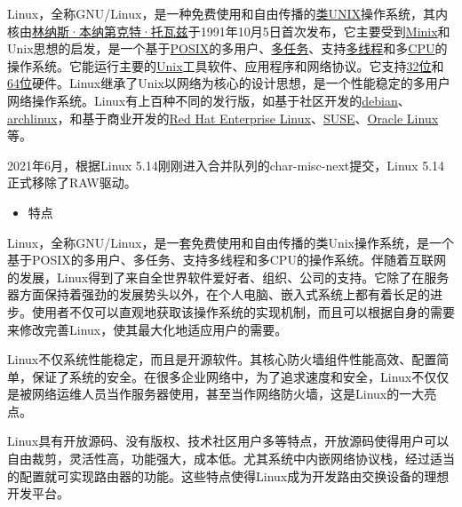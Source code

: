 \documentclass[
]{article}
\begin{document}
Linux，全称GNU/Linux，是一种免费使用和自由传播的\href{https://baike.baidu.com/item/类UNIX/9032872}{类UNIX}操作系统，其内核由\href{https://baike.baidu.com/item/林纳斯·本纳第克特·托瓦兹/1034429}{林纳斯·本纳第克特·托瓦兹}于1991年10月5日首次发布，它主要受到\href{https://baike.baidu.com/item/Minix/7106045}{Minix}和Unix思想的启发，是一个基于\href{https://baike.baidu.com/item/POSIX}{POSIX}的多用户、\href{https://baike.baidu.com/item/多任务/1011764}{多任务}、支持\href{https://baike.baidu.com/item/多线程/1190404}{多线程}和多\href{https://baike.baidu.com/item/CPU}{CPU}的操作系统。它能运行主要的\href{https://baike.baidu.com/item/Unix/219943}{Unix}工具软件、应用程序和网络协议。它支持\href{https://baike.baidu.com/item/32位/5812218}{32位}和\href{https://baike.baidu.com/item/64位}{64位}硬件。Linux继承了Unix以网络为核心的设计思想，是一个性能稳定的多用户网络操作系统。Linux有上百种不同的发行版，如基于社区开发的\href{https://baike.baidu.com/item/debian/748667}{debian}、\href{https://baike.baidu.com/item/archlinux/10857530}{archlinux}，和基于商业开发的\href{https://baike.baidu.com/item/Red\%20Hat\%20Enterprise\%20Linux/10770503}{Red
Hat Enterprise
Linux}、\href{https://baike.baidu.com/item/SUSE/60409}{SUSE}、\href{https://baike.baidu.com/item/Oracle\%20Linux/6876458}{Oracle
Linux}等。

2021年6月，根据Linux 5.14刚刚进入合并队列的char-misc-next提交，Linux
5.14正式移除了RAW驱动。

\begin{itemize}
\item
  特点
\end{itemize}

Linux，全称GNU/Linux，是一套免费使用和自由传播的类Unix操作系统，是一个基于POSIX的多用户、多任务、支持多线程和多CPU的操作系统。伴随着互联网的发展，Linux得到了来自全世界软件爱好者、组织、公司的支持。它除了在服务器方面保持着强劲的发展势头以外，在个人电脑、嵌入式系统上都有着长足的进步。使用者不仅可以直观地获取该操作系统的实现机制，而且可以根据自身的需要来修改完善Linux，使其最大化地适应用户的需要。

Linux不仅系统性能稳定，而且是开源软件。其核心防火墙组件性能高效、配置简单，保证了系统的安全。在很多企业网络中，为了追求速度和安全，Linux不仅仅是被网络运维人员当作服务器使用，甚至当作网络防火墙，这是Linux的一大亮点。

Linux具有开放源码、没有版权、技术社区用户多等特点，开放源码使得用户可以自由裁剪，灵活性高，功能强大，成本低。尤其系统中内嵌网络协议栈，经过适当的配置就可实现路由器的功能。这些特点使得Linux成为开发路由交换设备的理想开发平台。
\end{document}
